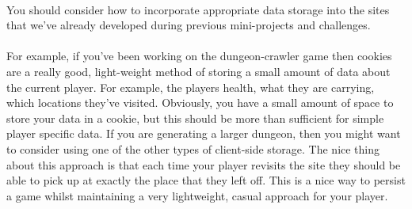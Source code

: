\documentclass[10pt, a4paper]{article}
\begin{document}
\paragraph{} You should consider how to incorporate appropriate data storage into the sites that we've already developed during previous mini-projects and challenges. 

\paragraph{} For example, if you've been working on the dungeon-crawler game then cookies are a really good, light-weight method of storing a small amount of data about the current player. For example, the players health, what they are carrying, which locations they've visited. Obviously, you have a small amount of space to store your data in a cookie, but this should be more than sufficient for simple player specific data. If you are generating a larger dungeon, then you might want to consider using one of the other types of client-side storage. The nice thing about this approach is that each time your player revisits the site they should be able to pick up at exactly the place that they left off. This is a nice way to persist a game whilst maintaining a very lightweight, casual approach for your player.
\end{document}
